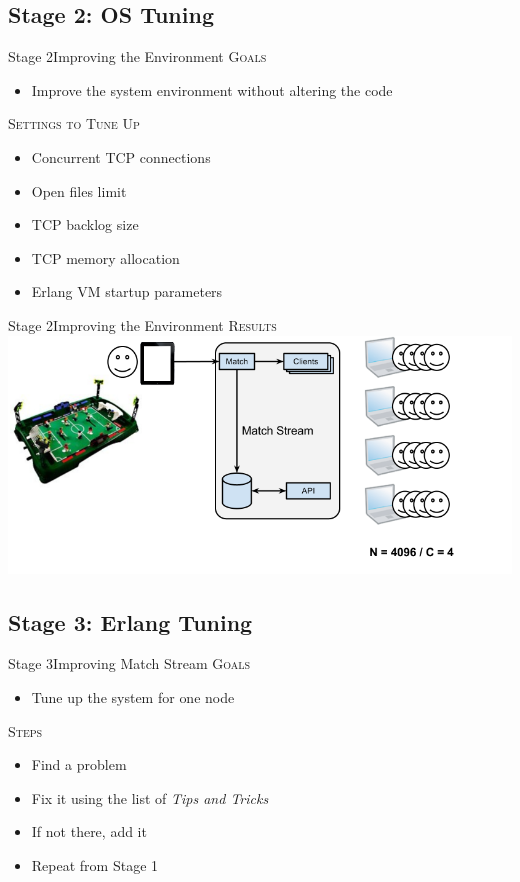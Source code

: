 \documentclass[utf8]{beamer}
\begin{document}
\subsection{Stage 2: OS Tuning}
\begin{frame}{Stage 2}{Improving the Environment}
	\textsc{Goals}
	\begin{itemize}
		\item Improve the system environment without altering the code
	\end{itemize}
	\pause
	\textsc{Settings to Tune Up}
	\begin{itemize}
		\item<+-> Concurrent TCP connections
		\item<+-> Open files limit
		\item<+-> TCP backlog size
		\item<+-> TCP memory allocation
		\item<+-> Erlang VM startup parameters
	\end{itemize}
\end{frame}
\begin{frame}{Stage 2}{Improving the Environment}
	\textsc{Results}
	\includegraphics[top=-1,width=\textwidth]{img/MatchStream-2.png}
\end{frame}

\subsection{Stage 3: Erlang Tuning}
\begin{frame}{Stage 3}{Improving Match Stream}
	\textsc{Goals}
	\begin{itemize}
		\item Tune up the system for \alert{one node}
	\end{itemize}
	\pause
	\textsc{Steps}
	\begin{itemize}
		\item Find a problem
		\item Fix it using the list of \emph{Tips and Tricks}
		\item If not there, add it
		\item Repeat from \alert{Stage 1}
	\end{itemize}
\end{frame}
\end{document}
